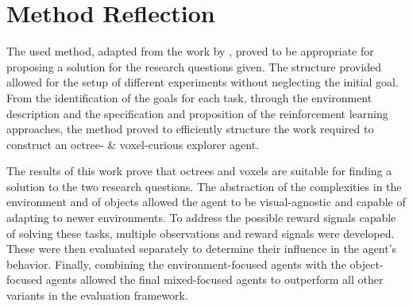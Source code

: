         
    
    
    
  

\section{Method Reflection}\label{sec:method-reflection}
    
    The used method, adapted from the work by \cite{luckert2016using}, proved to be appropriate for proposing a solution for the research questions given. The structure provided allowed for the setup of different experiments without neglecting the initial goal. From the identification of the goals for each task, through the environment description and the specification and proposition of the reinforcement learning approaches, the method proved to efficiently structure the work required to construct an octree- & voxel-curious explorer agent.
    
    The results of this work prove that octrees and voxels are suitable for finding a solution to the two research questions. The abstraction of the complexities in the environment and of objects allowed the agent to be visual-agnostic and capable of adapting to newer environments. To address the possible reward signals capable of solving these tasks, multiple observations and reward signals were developed. These were then evaluated separately to determine their influence in the agent's behavior. Finally, combining the environment-focused agents with the object-focused agents allowed the final mixed-focused agents to outperform all other variants in the evaluation framework.

